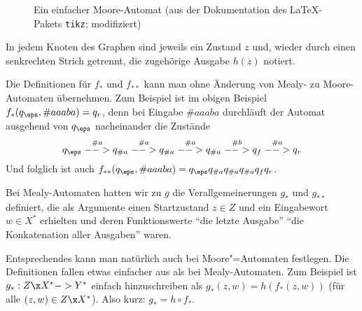 \begin{figure}[ht]
  \centering
  \caption{Ein einfacher Moore-Automat (aus der Dokumentation des
    \LaTeX-Pakets \texttt{tikz}; modifiziert)}
  \label{fig:bsp-moore-auto}
\end{figure}

In jedem Knoten des Graphen sind jeweils ein Zustand $z$ und, wieder
durch einen senkrechten Strich getrennt, die zugehörige Ausgabe $h(z)$
notiert.

Die Definitionen für $f_*$ und
$f_{**}$ kann man ohne Änderung von Mealy- zu
Moore-Automaten übernehmen. Zum Beispiel ist im obigen Beispiel
$f_*(q_{\eps}, \#{aaaba})=q_r$, denn bei Eingabe $\#{aaaba}$
durchläuft der Automat ausgehend von $q_{\eps}$ nacheinander die
Zustände
\[
q_{\eps} \stackrel{\#a}{-->} q_{\#a} \stackrel{\#a}{-->} q_{\#a}
\stackrel{\#a}{-->} q_{\#a} \stackrel{\#b}{-->} q_f \stackrel{\#a}{-->} q_r
\]
Und folglich ist auch $f_{**}(q_{\eps},
\#{aaaba})=q_{\eps}q_{\#a}q_{\#a}q_{\#a}q_fq_r$.

Bei Mealy-Automaten hatten wir zu $g$ die Verallgemeinerungen $g_*$
und $g_{**}$ definiert, die als Argumente einen Startzustand $z\in Z$
und ein Eingabewort $w\in X^*$ erhielten und deren Funktionswerte
"`die letzte Ausgabe"' \bzw "`die Konkatenation aller Ausgaben"'
waren.

Entsprechendes kann man natürlich auch bei Moore"=Automaten
festlegen. Die Definitionen fallen etwas einfacher aus als bei
Mealy-Automaten. Zum Beispiel ist $g_*:Z\x X^* ->
Y^*$ einfach
hinzuschreiben als $g_*(z,w)=h(f_*(z,w))$ (für alle $(z,w)\in Z\x
X^*$). Also kurz: $g_*=h\circ f_*$.

